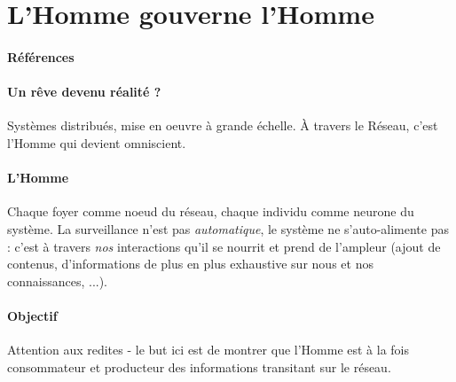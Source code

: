 \section{L'Homme gouverne l'Homme}
\paragraph{Références} \cite{GhostInTheShell}

\paragraph{Un rêve devenu réalité ?} Systèmes distribués, mise en oeuvre à grande échelle.
À travers le Réseau, c'est l'Homme qui devient omniscient.

\paragraph{L'Homme} Chaque foyer comme noeud du réseau, chaque individu comme neurone du
système. La surveillance n'est pas \emph{automatique}, le système ne s'auto-alimente pas :
c'est à travers \emph{nos} interactions qu'il se nourrit et prend de l'ampleur (ajout de 
contenus, d'informations de plus en plus exhaustive sur nous et nos connaissances, ...).

\paragraph{Objectif} Attention aux redites - le but ici est de montrer que l'Homme est à la fois
consommateur et producteur des informations transitant sur le réseau.